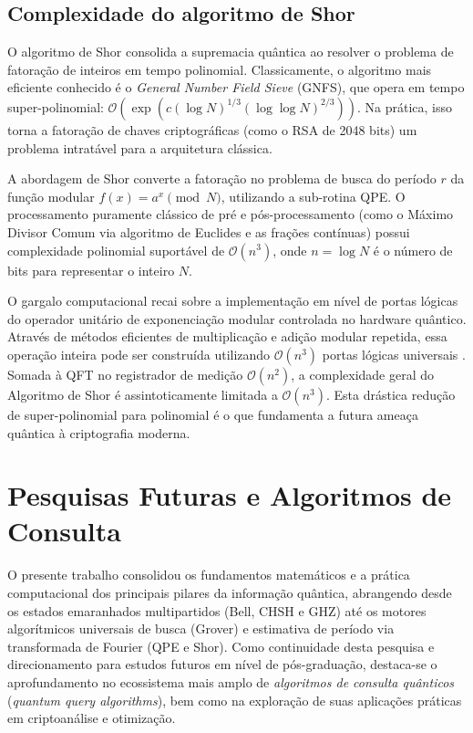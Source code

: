 \documentclass[12pt, a4paper]{article}
\begin{document}
\subsection{Complexidade do algoritmo de Shor}

O algoritmo de Shor consolida a supremacia quântica ao resolver o problema de fatoração de inteiros em tempo polinomial. Classicamente, o algoritmo mais eficiente conhecido é o \textit{General Number Field Sieve} (GNFS), que opera em tempo super-polinomial: $\mathcal{O}\left(\exp\left(c (\log N)^{1/3} (\log \log N)^{2/3}\right)\right)$. Na prática, isso torna a fatoração de chaves criptográficas (como o RSA de 2048 bits) um problema intratável para a arquitetura clássica.

A abordagem de Shor converte a fatoração no problema de busca do período $r$ da função modular $f(x) = a^x \pmod{N}$, utilizando a sub-rotina QPE. O processamento puramente clássico de pré e pós-processamento (como o Máximo Divisor Comum via algoritmo de Euclides e as frações contínuas) possui complexidade polinomial suportável de $\mathcal{O}(n^3)$, onde $n = \log N$ é o número de bits para representar o inteiro $N$.

O gargalo computacional recai sobre a implementação em nível de portas lógicas do operador unitário de exponenciação modular controlada no hardware quântico. Através de métodos eficientes de multiplicação e adição modular repetida, essa operação inteira pode ser construída utilizando $\mathcal{O}(n^3)$ portas lógicas universais \cite{nielsen2010}. Somada à QFT no registrador de medição $\mathcal{O}(n^2)$, a complexidade geral do Algoritmo de Shor é assintoticamente limitada a $\mathcal{O}(n^3)$. Esta drástica redução de super-polinomial para polinomial é o que fundamenta a futura ameaça quântica à criptografia moderna.

\section{Pesquisas Futuras e Algoritmos de Consulta}

O presente trabalho consolidou os fundamentos matemáticos e a prática computacional dos principais pilares da informação quântica, abrangendo desde os estados emaranhados multipartidos (Bell, CHSH e GHZ) até os motores algorítmicos universais de busca (Grover) e estimativa de período via transformada de Fourier (QPE e Shor). Como continuidade desta pesquisa e direcionamento para estudos futuros em nível de pós-graduação, destaca-se o aprofundamento no ecossistema mais amplo de \textit{algoritmos de consulta quânticos} (\textit{quantum query algorithms}), bem como na exploração de suas aplicações práticas em criptoanálise e otimização.
\end{document}
